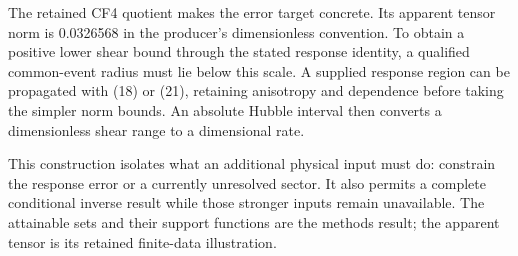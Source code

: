 \documentclass[aps,prd,reprint,onecolumn,11pt,nofootinbib,notitlepage]{revtex4-2}
\begin{document}
The retained CF4 quotient makes the error target concrete. Its apparent tensor norm is 0.0326568 in the producer's dimensionless convention. To obtain a positive lower shear bound through the stated response identity, a qualified common-event radius must lie below this scale. A supplied response region can be propagated with (18) or (21), retaining anisotropy and dependence before taking the simpler norm bounds. An absolute Hubble interval then converts a dimensionless shear range to a dimensional rate.

This construction isolates what an additional physical input must do: constrain the response error or a currently unresolved sector. It also permits a complete conditional inverse result while those stronger inputs remain unavailable. The attainable sets and their support functions are the methods result; the apparent tensor is its retained finite-data illustration.



\end{document}
